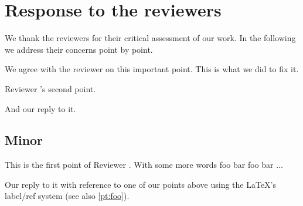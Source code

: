 \documentclass[11pt]{article}
\begin{document}
\section*{Response to the reviewers}
We thank the reviewers for their critical assessment of our work.
In the following we address their concerns point by point.

\reviewersection

\begin{point}
  \lipsum[1]
  \label{pt:foo}
\end{point}

\begin{reply}
  We agree with the reviewer on this important point. This is what we did to
  fix it.
  \lipsum[2]
\end{reply}

\begin{point}
  Reviewer \thereviewer's second point.
  \label{pt:bar}
\end{point}

\begin{reply}
  And our reply to it.
\end{reply}

\subsection*{Minor}


\reviewersection

\begin{point}
  This is the first point of Reviewer \thereviewer. With some more words foo
  bar foo bar ...
\end{point}

\begin{reply}
  Our reply to it with reference to one of our points above using the \LaTeX's
  label/ref system (see also \ref{pt:foo}).
\end{reply}
\end{document}
